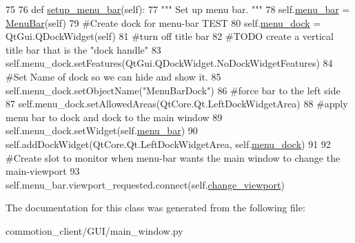 \begin{DoxyCode}
75 
76     \textcolor{keyword}{def }\hyperlink{classcommotion__client_1_1GUI_1_1main__window_1_1MainWindow_abacf45b62be7d880089c913e3f2f7f24}{setup\_menu\_bar}(self):
77         \textcolor{stringliteral}{""" Set up menu bar. """}
78         self.\hyperlink{classcommotion__client_1_1GUI_1_1main__window_1_1MainWindow_aeb2999af8c5674cefb026fdb70e72cea}{menu\_bar} = \hyperlink{classcommotion__client_1_1GUI_1_1menu__bar_1_1MenuBar}{MenuBar}(self)
79         \textcolor{comment}{#Create dock for menu-bar TEST}
80         self.\hyperlink{classcommotion__client_1_1GUI_1_1main__window_1_1MainWindow_a94ece117d428ecf011a8a8a8d2bf6d14}{menu\_dock} = QtGui.QDockWidget(self)
81         \textcolor{comment}{#turn off title bar}
82         \textcolor{comment}{#TODO create a vertical title bar that is the "dock handle"}
83         self.menu\_dock.setFeatures(QtGui.QDockWidget.NoDockWidgetFeatures)
84         \textcolor{comment}{#Set Name of dock so we can hide and show it.}
85         self.menu\_dock.setObjectName(\textcolor{stringliteral}{"MenuBarDock"})
86         \textcolor{comment}{#force bar to the left side}
87         self.menu\_dock.setAllowedAreas(QtCore.Qt.LeftDockWidgetArea)
88         \textcolor{comment}{#apply menu bar to dock and dock to the main window}
89         self.menu\_dock.setWidget(self.\hyperlink{classcommotion__client_1_1GUI_1_1main__window_1_1MainWindow_aeb2999af8c5674cefb026fdb70e72cea}{menu\_bar})
90         self.addDockWidget(QtCore.Qt.LeftDockWidgetArea, self.\hyperlink{classcommotion__client_1_1GUI_1_1main__window_1_1MainWindow_a94ece117d428ecf011a8a8a8d2bf6d14}{menu\_dock})
91 
92         \textcolor{comment}{#Create slot to monitor when menu-bar wants the main window to change the main-viewport}
93         self.menu\_bar.viewport\_requested.connect(self.\hyperlink{classcommotion__client_1_1GUI_1_1main__window_1_1MainWindow_a0e9201cd1165369bdac93cf1b4658c6f}{change\_viewport})

\end{DoxyCode}


The documentation for this class was generated from the following file\-:\begin{DoxyCompactItemize}
\item 
commotion\-\_\-client/\-G\-U\-I/main\-\_\-window.\-py\end{DoxyCompactItemize}
